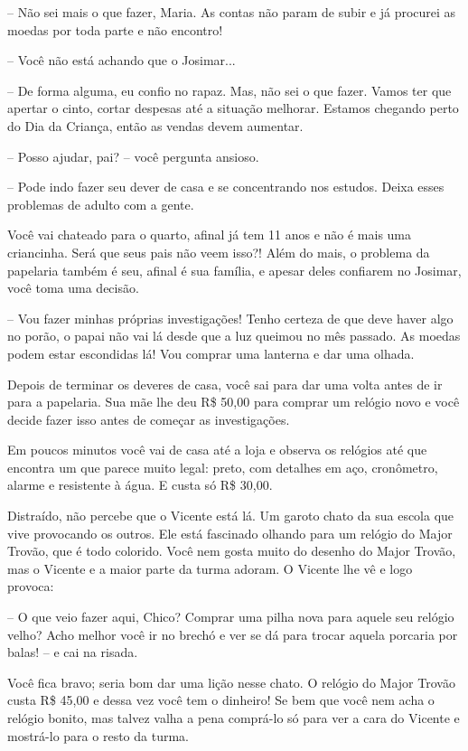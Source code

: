 -- Não sei mais o que fazer, Maria. As contas não param de subir e já procurei as moedas por toda parte e não encontro!

-- Você não está achando que o Josimar...

-- De forma alguma, eu confio no rapaz. Mas, não sei o que fazer. Vamos ter que apertar o cinto, cortar despesas até a situação melhorar. Estamos chegando perto do Dia da Criança, então as vendas devem aumentar.

-- Posso ajudar, pai? -- você pergunta ansioso.

-- Pode indo fazer seu dever de casa e se concentrando nos estudos. Deixa esses problemas de adulto com a gente.

Você vai chateado para o quarto, afinal já tem 11 anos e não é mais uma criancinha. Será que seus pais não veem isso?! Além do mais, o problema da papelaria também é seu, afinal é sua família, e apesar deles confiarem no Josimar, você toma uma decisão.

-- Vou fazer minhas próprias investigações! Tenho certeza de que deve haver algo no porão, o papai não vai lá desde que a luz queimou no mês passado. As moedas podem estar escondidas lá! Vou comprar uma lanterna e dar uma olhada.

Depois de terminar os deveres de casa, você sai para dar uma volta antes de ir para a papelaria. Sua mãe lhe deu R\$ 50,00 para comprar um relógio novo e você decide fazer isso antes de começar as investigações.

Em poucos minutos você vai de casa até a loja e observa os relógios até que encontra um que parece muito legal: preto, com detalhes em aço, cronômetro, alarme e resistente à água. E custa só R\$ 30,00.

Distraído, não percebe que o Vicente está lá. Um garoto chato da sua escola que vive provocando os outros. Ele está fascinado olhando para um relógio do Major Trovão, que é todo colorido. Você nem gosta muito do desenho do Major Trovão, mas o Vicente e a maior parte da turma adoram. O Vicente lhe vê e logo provoca:

-- O que veio fazer aqui, Chico? Comprar uma pilha nova para aquele seu relógio velho? Acho melhor você ir no brechó e ver se dá para trocar aquela porcaria por balas!
-- e cai na risada.

Você fica bravo; seria bom dar uma lição nesse chato. O relógio do Major Trovão custa R\$ 45,00 e dessa vez você tem o dinheiro! Se bem que você nem acha o relógio bonito, mas talvez valha a pena comprá-lo só para ver a cara do Vicente e mostrá-lo para o resto da turma.

